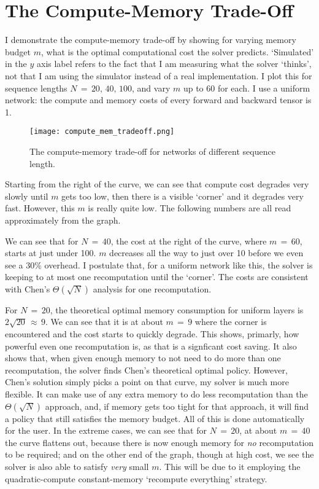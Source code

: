 \section{The Compute-Memory Trade-Off}
I demonstrate the compute-memory trade-off by showing for varying memory budget \(m\), what is the optimal computational cost the solver predicts.
`Simulated' in the \(y\) axis label refers to the fact that I am measuring what the solver `thinks', not that I am using the simulator instead of a real implementation.
I plot this for sequence lengths \(N\,=\, 20,\,40,\,100\), and vary \(m\) up to \(60\) for each.
I use a uniform network: the compute and memory costs of every forward and backward tensor is 1.

\begin{figure}[h]
    \centering
    \texttt{[image: compute\_mem\_tradeoff.png]}
    \caption{The compute-memory trade-off for networks of different sequence length.}
    \label{fig:4-cm-tradeoff}
\end{figure}

Starting from the right of the curve, we can see that compute cost degrades very slowly until \(m\) gets too low, then there is a visible `corner' and it degrades very fast.
However, this \(m\) is really quite low.
The following numbers are all read approximately from the graph.

We can see that for \(N\,=\,40\), the cost at the right of the curve, where \(m\,=\,60\), starts at just under 100.
\(m\) decreases all the way to just over 10 before we even see a 30\% overhead.
I postulate that, for a uniform network like this, the solver is keeping to at most one recomputation until the `corner'.
The costs are consistent with Chen's \(\Theta(\sqrt{N})\) analysis for one recomputation.

For \(N\,=\,20\), the theoretical optimal memory consumption for uniform layers is \(2\sqrt{20}\,\approx\,9\).
We can see that it is at about \(m\,=\,9\) where the corner is encountered and the cost starts to quickly degrade.
This shows, primarly, how powerful even one recomputation is, as that is a signficant cost saving.
It also shows that, when given enough memory to not need to do more than one recomputation, the solver finds Chen's theoretical optimal policy.
However, Chen's solution simply picks a point on that curve, my solver is much more flexible.
It can make use of any extra memory to do less recomputation than the \(\Theta(\sqrt{N})\) approach, and, if memory gets too tight for that approach, it will find a policy that still satisfies the memory budget.
All of this is done automatically for the user.
In the extreme cases, we can see that for \(N\,=\,20\), at about \(m\,=\,40\) the curve flattens out, because there is now enough memory for \textit{no} recomputation to be required;
and on the other end of the graph, though at high cost, we see the solver is also able to satisfy \textit{very} small \(m\).
This will be due to it employing the quadratic-compute constant-memory `recompute everything' strategy.

